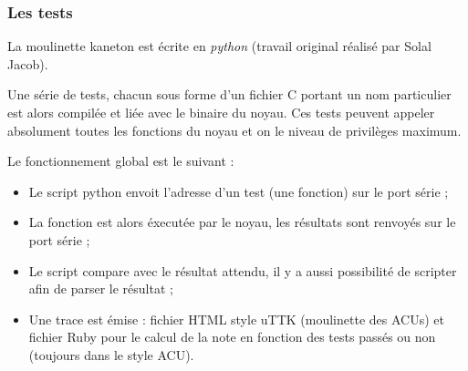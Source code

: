 
\begin{frame}
  \frametitle{Les tests}

  La moulinette kaneton est \'{e}crite en \emph{python} (travail original
  r\'{e}alis\'{e} par Solal Jacob).

  \-

  Une s\'{e}rie de tests, chacun sous forme d'un fichier C portant un nom
  particulier est alors compil\'{e}e et li\'{e}e avec le binaire du noyau. Ces
  tests peuvent appeler absolument toutes les fonctions du noyau et on
  le niveau de privil\`{e}ges maximum.

  \-

  Le fonctionnement global est le suivant :

  \begin{itemize}
  \item
    Le script python envoit l'adresse d'un test (une fonction) sur le
    port s\'{e}rie ;
  \item
    La fonction est alors \'{e}xecut\'{e}e par le noyau, les r\'{e}sultats sont
    renvoy\'{e}s sur le port s\'{e}rie ;
  \item
    Le script compare avec le r\'{e}sultat attendu, il y a aussi
    possibilit\'{e} de scripter afin de parser le r\'{e}sultat ;
  \item
    Une trace est \'{e}mise : fichier HTML style uTTK (moulinette des
    ACUs) et fichier Ruby pour le calcul de la note en fonction des
    tests pass\'{e}s ou non (toujours dans le style ACU).
  \end{itemize}

\end{frame}


